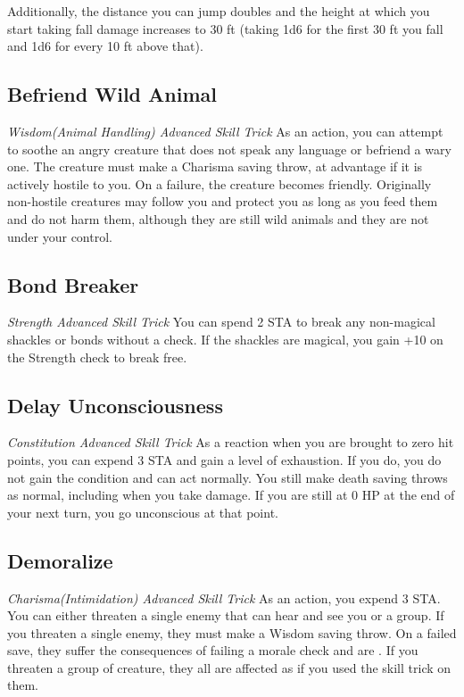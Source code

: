 Additionally, the distance you can jump doubles and the height at which you start taking fall damage increases to 30 ft (taking 1d6 for the first 30 ft you fall and 1d6 for every 10 ft above that).

\subsection{Befriend Wild Animal}
\textit{Wisdom(Animal Handling) Advanced Skill Trick}
As an action, you can attempt to soothe an angry creature that does not speak any language or befriend a wary one. The creature must make a Charisma saving throw, at advantage if it is actively hostile to you. On a failure, the creature becomes friendly. Originally non-hostile creatures may follow you and protect you as long as you feed them and do not harm them, although they are still wild animals and they are not under your control.

\subsection{Bond Breaker}
\textit{Strength Advanced Skill Trick}
You can spend 2 STA to break any non-magical shackles or bonds without a check. If the shackles are magical, you gain +10 on the Strength check to break free.

\subsection{Delay Unconsciousness}
\textit{Constitution Advanced Skill Trick}
As a reaction when you are brought to zero hit points, you can expend 3 STA and gain a level of exhaustion. If you do, you do not gain the  condition and can act normally. You still make death saving throws as normal, including when you take damage. If you are still at 0 HP at the end of your next turn, you go unconscious at that point.

\subsection{Demoralize}\label{st:demoralize}
\textit{Charisma(Intimidation) Advanced Skill Trick}
As an action, you expend 3 STA. You can either threaten a single enemy that can hear and see you or a group. If you threaten a single enemy, they must make a Wisdom saving throw. On a failed save, they suffer the consequences of failing a morale check and are . If you threaten a group of creature, they all are affected as if you used the  skill trick on them.

